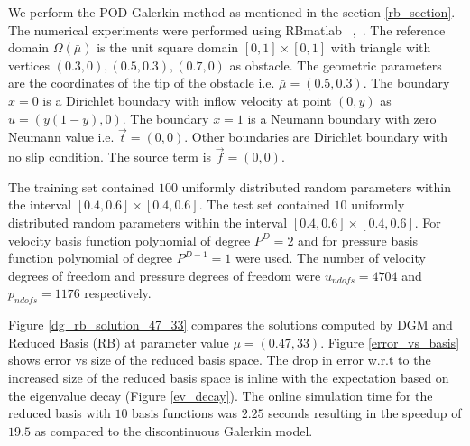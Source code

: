 \documentclass[graybox]{svmult}
\begin{document}
We perform the POD-Galerkin method as mentioned in the section \ref{rb_section}. The numerical experiments were performed using RBmatlab ~\cite{rbmatlab},~\cite{master_thesis}. The reference domain $\Omega({\bar{\mu}})$ is the unit square domain $[0,1] \times [0,1]$ with triangle with vertices $(0.3,0),(0.5,0.3),(0.7,0)$ as obstacle. The geometric parameters are the coordinates of the tip of the obstacle i.e. $\bar{\mu} = (0.5,0.3)$. The boundary ${x=0}$ is a Dirichlet boundary with inflow velocity at point $(0,y)$ as $u = (y(1-y), 0)$. The boundary ${x = 1}$ is a Neumann boundary with zero Neumann value i.e. $\overrightarrow{t} = (0, 0)$. Other boundaries are Dirichlet boundary with no slip condition. The source term is $\overrightarrow{f} = (0,0)$.

The training set contained $100$ uniformly distributed random parameters within the interval $[0.4,0.6] \times [0.4,0.6]$. The test set contained $10$ uniformly distributed random parameters within the interval $[0.4,0.6] \times [0.4,0.6]$. For velocity basis function polynomial of degree $P^D = 2$ and for pressure basis function polynomial of degree $P^{D-1} = 1$ were used. The number of velocity degrees of freedom and pressure degrees of freedom were $u_{ndofs} = 4704$ and $p_{ndofs} = 1176$ respectively.

Figure \ref{dg_rb_solution_47_33} compares the solutions computed by DGM and Reduced Basis (RB) at parameter value $\mu = (0.47,33)$. Figure \ref{error_vs_basis} shows error vs size of the reduced basis space. The drop in error w.r.t to the increased size of the reduced basis space is inline with the expectation based on the eigenvalue decay (Figure \ref{ev_decay}). The online simulation time for the reduced basis with $10$ basis functions was $2.25$ seconds resulting in the speedup of $19.5$ as compared to the discontinuous Galerkin model.
\end{document}
